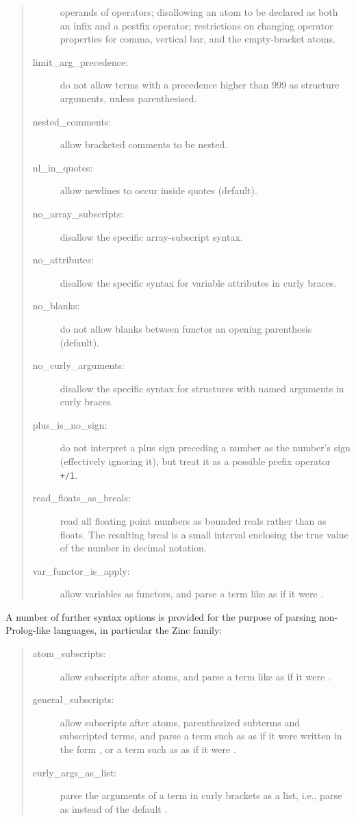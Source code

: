 \begin{quote}
\begin{description}
      operands of operators; disallowing an atom to be declared as both
      an infix and a postfix operator; restrictions on changing operator
      properties for comma, vertical bar, and the empty-bracket atoms.
\item[limit_arg_precedence:]
    do not allow terms with a precedence higher than 999 as
    structure arguments, unless parenthesised.
\item[nested_comments:] allow bracketed comments to be nested.
\item[nl_in_quotes:] allow newlines to occur inside quotes (default).
\item[no_array_subscripts:] disallow the {\eclipse} specific array-subscript
    syntax.
\item[no_attributes:] disallow the {\eclipse} specific syntax for
    variable attributes in curly braces.
\item[no_blanks:] do not allow blanks between functor an opening parenthesis
    (default).
\item[no_curly_arguments:] disallow the {\eclipse} specific syntax for
    structures with named arguments in curly braces.
\item[plus_is_no_sign:]
    do not interpret a plus sign preceding a number as the number's sign
    (effectively ignoring it), but treat it as a possible prefix operator
    \verb:+/1:.
\item[read_floats_as_breals:] read all floating point numbers as bounded
    reals rather than as floats. The resulting breal is a small interval
    enclosing the true value of the number in decimal notation.
\item[var_functor_is_apply:] allow variables as functors, and parse a term
    like  as if it were .
\end{description}
\end{quote}
A number of further syntax options is provided for the purpose of parsing
non-Prolog-like languages, in particular the Zinc family:
\begin{quote}
\begin{description}
\item[atom_subscripts:] allow subscripts after atoms, and parse a term
    like  as if it were .
\item[general_subscripts:] allow subscripts after atoms, parenthesized
    subterms and subscripted terms, and parse a term
    such as  as if it were written in the form
    ,
    or a term such as  as if it were
    .
\item[curly_args_as_list:] parse the arguments of a term in curly
    brackets as a list, i.e., parse 
    as \notation{\{\}([a,b,c])} instead of the default .
\end{description}
\end{quote}
